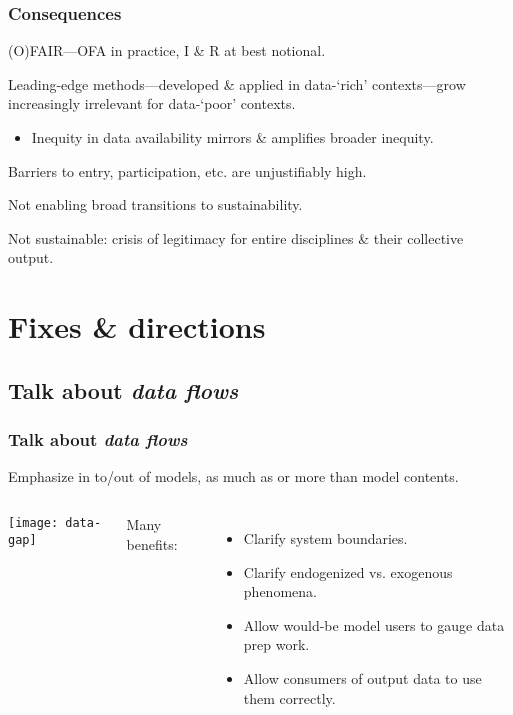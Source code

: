 \documentclass[14pt,aspectratio=169]{beamer}
\begin{document}
\begin{frame}
\frametitle{Consequences}

(O)FAIR—OFA in practice, I \& R at best notional.

\medskip \pause
Leading-edge methods—developed \& applied in data-‘rich’ contexts—grow increasingly irrelevant for data-‘poor’ contexts.%
\begin{itemize}
  \item Inequity in data availability mirrors \& amplifies broader inequity.
\end{itemize}

\medskip \pause
Barriers to entry, participation, etc. are unjustifiably high.

\medskip \pause
Not enabling broad transitions to sustainability.

\medskip \pause
Not sustainable: crisis of legitimacy for entire disciplines \& their collective output.

\end{frame}

\section{Fixes \& directions}

\subsection{Talk about \emph{data flows}}

\begin{frame}
\frametitle{Talk about \emph{data flows}}

Emphasize  in to/out of models, as much as or more than model contents.

\begin{columns}
\texttt{[image: data-gap]}

\pause \small
Many benefits:
\begin{itemize}
  \item Clarify system boundaries.
  \item Clarify endogenized vs. exogenous phenomena.
  \item Allow would-be model users to gauge data prep work.
  \item Allow consumers of output data to use them correctly.
\end{itemize}
\end{columns}

\end{frame}
\end{document}
